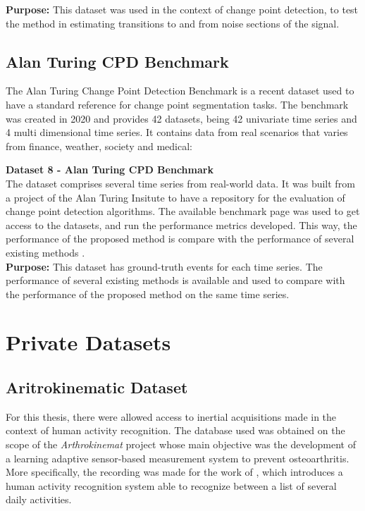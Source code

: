 \textbf{Purpose:} This dataset was used in the context of change point detection, to test the method in estimating transitions to and from noise sections of the signal.


\subsection{Alan Turing CPD Benchmark}

The Alan Turing Change Point Detection Benchmark is a recent dataset used to have a standard reference for change point segmentation tasks. The benchmark was created in 2020 and provides 42 datasets, being 42 univariate time series and 4 multi dimensional time series. It contains data from real scenarios that varies from finance, weather, society and medical:

\item \textbf{Dataset 8 - Alan Turing CPD Benchmark}\\
The dataset comprises several time series from real-world data. It was built from a project of the Alan Turing Insitute to have a repository for the evaluation of change point detection algorithms. The available benchmark page was used to get access to the datasets, and run the performance metrics developed. This way, the performance of the proposed method is compare with the performance of several existing methods \cite{cpd_alan}.\\

\textbf{Purpose:} This dataset has ground-truth events for each time series. The performance of several existing methods is available and used to compare with the performance of the proposed method on the same time series.

\section{Private Datasets}

\subsection{Aritrokinematic Dataset}

For this thesis, there were allowed access to inertial acquisitions made in the context of human activity recognition. The database used was obtained on the scope of the \textit{Arthrokinemat} project whose main objective was the development of a learning adaptive sensor-based measurement system to prevent osteoarthritis\cite{arthrokinemat}. More specifically, the recording was made for the work of \cite{Liu2019}, which introduces a human activity recognition system able to recognize between a list of several daily activities.


